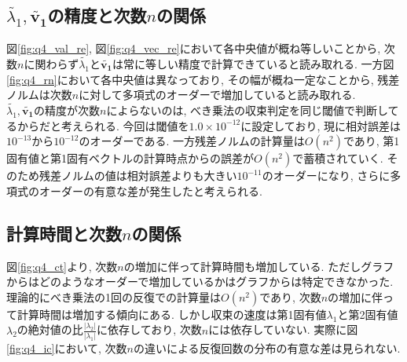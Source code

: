 \documentclass[uplatex,a4j]{jsarticle}
\begin{document}
\newpage
\subsection{$\tilde{\lambda_1}, \bm{\tilde{v_1}}$の精度と次数$n$の関係}
\label{sec:q4_2}
図\ref{fig:q4_val_re}, 図\ref{fig:q4_vec_re}において各中央値が概ね等しいことから, 
次数$n$に関わらず$\tilde{\lambda_1}$と$\bm{\tilde{v_1}}$は常に等しい精度で計算できていると読み取れる. 
一方図\ref{fig:q4_rn}において各中央値は異なっており, その幅が概ね一定なことから, 
残差ノルムは次数$n$に対して多項式のオーダーで増加していると読み取れる. \\
$\tilde{\lambda_1}, \bm{\tilde{v_1}}$の精度が次数$n$によらないのは, 
べき乗法の収束判定を同じ閾値で判断してるからだと考えられる. 
今回は閾値を$1.0 \times 10^{-12}$に設定しており, 現に相対誤差は$10^{-13}$から$10^{-12}$のオーダーである. 
一方残差ノルムの計算量は$O(n^2)$であり, 第1固有値と第1固有ベクトルの計算時点からの誤差が$O(n^2)$で蓄積されていく. 
そのため残差ノルムの値は相対誤差よりも大きい$10^{-11}$のオーダーになり, 
さらに多項式のオーダーの有意な差が発生したと考えられる. 

\subsection{計算時間と次数$n$の関係}
\label{sec:q4_3}
図\ref{fig:q4_ct}より, 次数$n$の増加に伴って計算時間も増加している. 
ただしグラフからはどのようなオーダーで増加しているかはグラフからは特定できなかった. 
理論的にべき乗法の1回の反復での計算量は$O(n^2)$であり, 次数$n$の増加に伴って計算時間は増加する傾向にある. 
しかし収束の速度は第1固有値$\lambda_1$と第2固有値$\lambda_2$の絶対値の比$\frac{|\lambda_2|}{|\lambda_1|}$に依存しており, 
次数$n$には依存していない. 
実際に図\ref{fig:q4_ic}において, 次数$n$の違いによる反復回数の分布の有意な差は見られない. 
\end{document}
